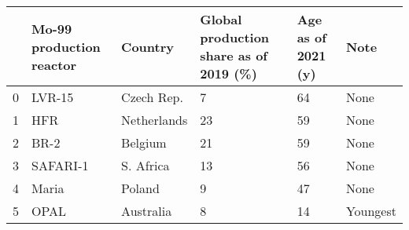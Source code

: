 \begin{tabular}{llllll}
\toprule
{} & Mo-99 production reactor &      Country & Global production share as of 2019 (\%) & Age as of 2021 (y) &      Note \\
\midrule
0 &                   LVR-15 &   Czech Rep. &                                      7 &                 64 &      None \\
1 &                      HFR &  Netherlands &                                     23 &                 59 &      None \\
2 &                     BR-2 &      Belgium &                                     21 &                 59 &      None \\
3 &                 SAFARI-1 &    S. Africa &                                     13 &                 56 &      None \\
4 &                    Maria &       Poland &                                      9 &                 47 &      None \\
5 &                     OPAL &    Australia &                                      8 &                 14 &  Youngest \\
\bottomrule
\end{tabular}
